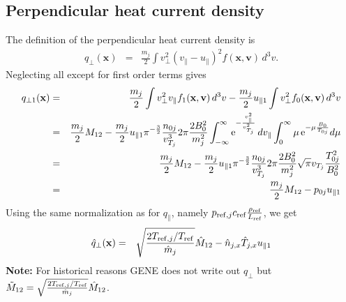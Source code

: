 \subsection{Perpendicular heat current density}
The definition of the perpendicular heat current density is
\begin{eqnarray*}
q_{\perp}(\mathbf{x}) &=& \frac{m_j}{2} \int v_{\perp}^2 \left(v_{\|}-u_{\|}\right)^2
  f(\mathbf{x},\mathbf{v})\,d^3v.
\end{eqnarray*}
Neglecting all except for first order terms gives
\begin{eqnarray*}
q_{\perp 1}(\mathbf{x})&=& \frac{m_j}{2} \int v_{\perp}^2 v_{\|} f_1(\mathbf{x},\mathbf{v})\,d^3v-
 \frac{m_j}{2}u_{\| 1} \int v_{\perp}^2 f_0(\mathbf{x},\mathbf{v})\,d^3v\\
&=& \frac{m_j}{2} M_{12} - \frac{m_j}{2}u_{\| 1} \pi^{-\frac{3}{2}}\frac{n_{0j}}{v_{T_j}^3}2\pi\frac{2B_0^2}{m_j^2}
 \int_{-\infty}^{\infty} {\rm e}^{-\frac{v_\|^2}{v_{T_j}^2}}\,dv_\| 
 \int_{0}^{\infty} \mu \, {\rm e}^{-\mu\frac{B_0}{T_{0j}}}d\mu \\
&=& \frac{m_j}{2} M_{12} - \frac{m_j}{2}u_{\| 1} \pi^{-\frac{3}{2}}\frac{n_{0j}}{v_{T_j}^3}2\pi\frac{2B_0^2}{m_j^2}
 \sqrt{\pi} v_{T_j} \frac{T_{0j}^2}{B_0^2}\\
&=& \frac{m_j}{2} M_{12} - p_{0j} u_{\| 1}
\end{eqnarray*}
Using the same normalization as for $q_\|$, namely $p_{\mathrm{ref},j} c_{\mathrm{ref}} \frac{\rho_{\mathrm{ref}}}{L_{\mathrm{ref}}}$, we get
\begin{eqnarray*}
\hat{q}_{\perp}(\mathbf{x})&=& \sqrt{\frac{2T_{\mathrm{ref},j}/T_{\mathrm{ref}}}{\hat{m}_j}} \hat{M}_{12} - \hat{n}_{j,x}\hat{T}_{j,x} u_{\| 1}
\end{eqnarray*}
{\bf Note:} For historical reasons {\sc GENE} does not write out $q_\perp$ but 
$\tilde{M}_{12}=\sqrt{\frac{2T_{\mathrm{ref},j}/T_{\mathrm{ref}}}{\hat{m}_j}}\hat{M}_{12}$.

